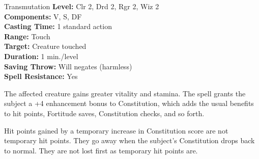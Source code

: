 {Transmutation}
{
	\textbf{Level:}
	Clr 2, Drd 2, Rgr 2, Wiz 2\\
	\textbf{Components:}
	V, S, DF\\
	\textbf{Casting Time:}
	1 standard action\\
	\textbf{Range:}
	Touch\\
	\textbf{Target:}
	Creature touched\\
	\textbf{Duration:}
	1 min./level\\
	\textbf{Saving Throw:}
	Will negates (harmless)\\
	\textbf{Spell Resistance:}
	Yes\\
}
{
	The affected creature gains greater vitality and stamina. The spell grants the subject a +4 enhancement bonus to Constitution, which adds the usual benefits to hit points, Fortitude saves, Constitution checks, and so forth.

	Hit points gained by a temporary increase in Constitution score are not temporary hit points. They go away when the subject's Constitution drops back to normal. They are not lost first as temporary hit points are.

}
